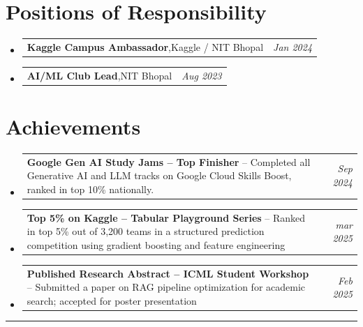 \documentclass[a4paper,11pt]{article}
\makeatletter
\newcommand{\resumePOR}[3]{
\vspace{0.5mm}\item
    \begin{tabular*}{0.97\textwidth}[t]{l@{\extracolsep{\fill}}r}
        \textbf{#1},\hspace{0.3mm}#2 & \textit{\small #3}
    \end{tabular*}
    \vspace{-2mm}
}
\newcommand{\resumeAchievement}[3]{
\vspace{0.5mm}\item
    \begin{tabular*}{0.97\textwidth}[t]{p{0.78\textwidth}@{\extracolsep{\fill}}r}
        \textbf{#1} -- {\small #2} & \textit{\small #3}
    \end{tabular*}
    \vspace{-2mm}
}
\newcommand{\resumeSubHeadingListStart}{\begin{itemize}[leftmargin=*,labelsep=1.5mm]}
\newcommand{\resumeSubHeadingListEnd}{\end{itemize}\vspace{2mm}}
\makeatother
\begin{document}

\section{Positions of Responsibility}
\vspace{-0.4mm}
\resumeSubHeadingListStart
  \resumePOR{Kaggle Campus Ambassador}
    {Kaggle / NIT Bhopal}
    {Jan 2024}
  \resumePOR{AI/ML Club Lead}
    {NIT Bhopal}
    {Aug 2023}
\resumeSubHeadingListEnd
\vspace{-4mm}

\section{Achievements}
\vspace{-0.2mm}
\resumeSubHeadingListStart
  \resumeAchievement{Google Gen AI Study Jams -- Top Finisher}
    {Completed all Generative AI and LLM tracks on Google Cloud Skills Boost, ranked in top 10\% nationally.}
    {Sep 2024}
  \resumeAchievement{Top 5\% on Kaggle -- Tabular Playground Series}
    {Ranked in top 5\% out of 3,200 teams in a structured prediction competition using gradient boosting and feature engineering}
    {mar 2025}
  \resumeAchievement{Published Research Abstract -- ICML Student Workshop}
    {Submitted a paper on RAG pipeline optimization for academic search; accepted for poster presentation}
    {Feb 2025}
\resumeSubHeadingListEnd
\vspace{-2mm}

\hspace*{-5mm}\rule{1.035\textwidth}{0.1mm}
\end{document}
